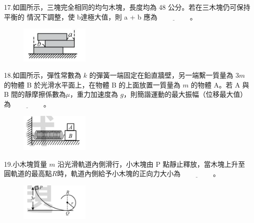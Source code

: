 \documentclass[cn,10pt,math=newtx,chinesefont=founder,device=ig]{elegantbook}
\begin{document}
\begin{example}
   17.如圖所示，三塊完全相同的均勻木塊，長度均為 48 公分。若在三木塊仍可保持平衡的 情況下調整，使 b達極大值，則 a + b 應為$\underline{\hspace{2cm}}$。\\
    \rightline{[桃園聯招教甄109]}
\end{example}
\begin{solution}
    
\end{solution}
\begin{figure}[htbp]
    \flushright
    \includegraphics[width=0.3\textwidth]{image/109桃聯17.png}
  \end{figure}
\newpage


\begin{example}
   18.如圖所示，彈性常數為 $k$ 的彈簧一端固定在鉛直牆壁，另一端繫一質量為 3$m$ 的物體 B
於光滑水平面上，在物體 B 的上面放置一質量為 $m$ 的物體 A。若 A 與 B 間的靜摩擦係數為$\mu$，重力加速度為 $g$，則簡諧運動的最大振幅（位移最大值）為$\underline{\hspace{2cm}}$。\\
    \rightline{[桃園聯招教甄109]}
\end{example}
\begin{solution}
    
\end{solution}
\begin{figure}[htbp]
    \flushright
    \includegraphics[width=0.3\textwidth]{image/109桃聯18.png}
  \end{figure}
\newpage


\begin{example}
   19.小木塊質量 $m$ 沿光滑軌道內側滑行，小木塊由 P 點靜止釋放，當木塊上升至圓軌道的最高點$R$時，軌道內側給予小木塊的正向力大小為$\underline{\hspace{2cm}}$。\\
    \rightline{[桃園聯招教甄109]}
\end{example}
\begin{solution}
    
\end{solution}
\begin{figure}[htbp]
    \flushright
    \includegraphics[width=0.3\textwidth]{image/109桃聯19.png}
  \end{figure}
\newpage
\end{document}
